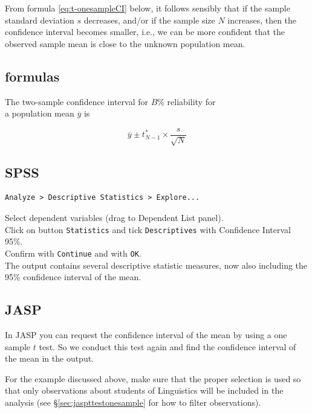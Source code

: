 \documentclass[
]{book}
\begin{document}
From formula \eqref{eq:t-onesampleCI} below, it follows sensibly that if the sample standard deviation \(s\) decreases, and/or if the sample size \(N\) increases, then the confidence interval becomes smaller, i.e., we can be more confident that the observed sample mean is close to the unknown population mean.

\hypertarget{sec:formulas13-2}{%
\subsection{formulas}\label{sec:formulas13-2}}

The two-sample confidence interval for \(B\)\% reliability for\\
a population mean \(\overline{y}\) is

\begin{equation}
    \overline{y} \pm t^*_{N-1} \times \frac{s}{\sqrt{N}}
  \label{eq:t-onesampleCI}
\end{equation}

\hypertarget{spss-11}{%
\subsection{SPSS}\label{spss-11}}

\begin{verbatim}
Analyze > Descriptive Statistics > Explore...
\end{verbatim}

Select dependent variables (drag to Dependent List panel).\\
Click on button \texttt{Statistics} and tick \texttt{Descriptives} with Confidence Interval
95\%.\\
Confirm with \texttt{Continue} and with \texttt{OK}.\\
The output contains several descriptive statistic measures, now also
including the 95\% confidence interval of the mean.

\hypertarget{jasp-11}{%
\subsection{JASP}\label{jasp-11}}

In JASP you can request the confidence interval of the mean by using a one sample \(t\) test.
So we conduct this test again and find the confidence interval of the mean in the output.

For the example discussed above, make sure that the proper selection is used so that only observations about students of Linguistics will be included in the analysis (see §\ref{sec:jaspttestonesample} for how to filter observations).
\end{document}
